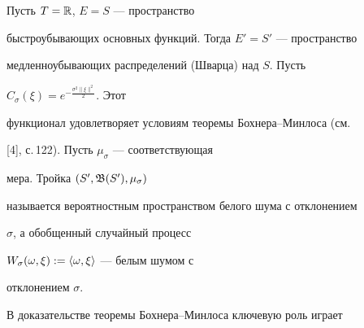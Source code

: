 \begin{exam}


Пусть $T=\Bbb{R}$, $E=S$ --- пространство


быстроубывающих основных функций. Тогда $E'=S'$ --- пространство


медленноубывающих распределений (Шварца) над $S$. Пусть


$C_{\sigma}(\xi)=e^{-\frac{\sigma^2\|\xi\|^2}{2}}$. Этот


функционал удовлетворяет условиям теоремы Бохнера--Минлоса (см.


[4], с.\,122). Пусть $\mu_{\sigma}$ --- соответствующая


мера. Тройка $ (S',\frak{B}(S'),\mu_{\sigma})$


называется вероятностным пространством белого шума с отклонением


$\sigma$, а обобщенный случайный процесс


$W_\sigma(\omega,\xi):=\langle \omega,\xi\rangle $ --- белым шумом с


отклонением $\sigma$.


\end{exam}





В доказательстве теоремы Бохнера--Минлоса ключевую роль играет





